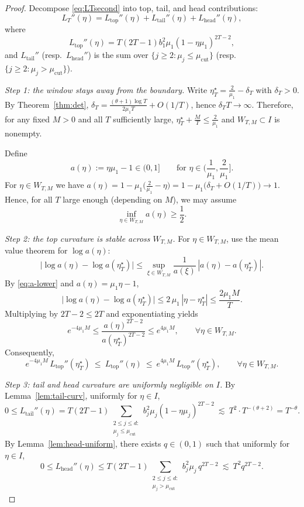 \documentclass[11pt]{article}
\begin{document}
\begin{proof}
Decompose \eqref{eq:LTsecond} into top, tail, and head contributions:
\[
L_T''(\eta)=L_{\mathrm{top}}''(\eta)+L_{\mathrm{tail}}''(\eta)+L_{\mathrm{head}}''(\eta),
\]
where
\[
L_{\mathrm{top}}''(\eta)=T(2T-1)b_1^2\mu_1(1-\eta\mu_1)^{2T-2},
\]
and $L_{\mathrm{tail}}''$ (resp.\ $L_{\mathrm{head}}''$) is the sum over
$\{j\ge 2:\mu_j\le \mu_{\mathrm{cut}}\}$ (resp.\ $\{j\ge 2:\mu_j>\mu_{\mathrm{cut}}\}$).

\medskip\noindent
\emph{Step 1: the window stays away from the boundary.}
Write $\eta_T^\star=\frac{2}{\mu_1}-\delta_T$ with $\delta_T>0$.
By Theorem~\ref{thm:det}, $\delta_T=\frac{(\theta+1)\log T}{2\mu_1 T}+O(1/T)$, hence
$\delta_T T\to\infty$. Therefore, for any fixed $M>0$ and all $T$ sufficiently large,
$\eta_T^\star+\frac{M}{T}\le \frac{2}{\mu_1}$ and $W_{T,M}\subset I$ is nonempty.

Define
\[
a(\eta):=\eta\mu_1-1\in(0,1] \qquad \text{for }\eta\in\Big(\frac{1}{\mu_1},\frac{2}{\mu_1}\Big].
\]
For $\eta\in W_{T,M}$ we have $a(\eta)=1-\mu_1\big(\frac{2}{\mu_1}-\eta\big)
=1-\mu_1\big(\delta_T+O(1/T)\big)\to 1$.
Hence, for all $T$ large enough (depending on $M$), we may assume
\begin{equation}\label{eq:a-lower}
\inf_{\eta\in W_{T,M}} a(\eta)\ge \frac12.
\end{equation}

\medskip\noindent
\emph{Step 2: the top curvature is stable across $W_{T,M}$.}
For $\eta\in W_{T,M}$, use the mean value theorem for $\log a(\eta)$:
\[
\big|\log a(\eta)-\log a(\eta_T^\star)\big|
\le \sup_{\xi\in W_{T,M}}\frac{1}{a(\xi)}\,|a(\eta)-a(\eta_T^\star)|.
\]
By \eqref{eq:a-lower} and $a(\eta)=\mu_1\eta-1$,
\[
\big|\log a(\eta)-\log a(\eta_T^\star)\big|
\le 2\,\mu_1\,|\eta-\eta_T^\star|
\le \frac{2\mu_1 M}{T}.
\]
Multiplying by $2T-2\le 2T$ and exponentiating yields
\[
e^{-4\mu_1 M}
\le
\frac{a(\eta)^{2T-2}}{a(\eta_T^\star)^{2T-2}}
\le
e^{4\mu_1 M},
\qquad \forall \eta\in W_{T,M}.
\]
Consequently,
\begin{equation}\label{eq:top-stable}
e^{-4\mu_1 M}\,L_{\mathrm{top}}''(\eta_T^\star)
\ \le\
L_{\mathrm{top}}''(\eta)
\ \le\
e^{4\mu_1 M}\,L_{\mathrm{top}}''(\eta_T^\star),
\qquad \forall \eta\in W_{T,M}.
\end{equation}

\medskip\noindent
\emph{Step 3: tail and head curvature are uniformly negligible on $I$.}
By Lemma~\ref{lem:tail-curv}, uniformly for $\eta\in I$,
\[
0\le L_{\mathrm{tail}}''(\eta)
=
T(2T-1)\sum_{\substack{2\le j\le d:\\ \mu_j\le\mu_{\mathrm{cut}}}}
b_j^2\mu_j(1-\eta\mu_j)^{2T-2}
\ \lesssim\
T^2\cdot T^{-(\theta+2)}
=
T^{-\theta}.
\]
By Lemma~\ref{lem:head-uniform}, there exists $q\in(0,1)$ such that uniformly for $\eta\in I$,
\[
0\le L_{\mathrm{head}}''(\eta)
\le
T(2T-1)\sum_{\substack{2\le j\le d:\\ \mu_j>\mu_{\mathrm{cut}}}}
b_j^2\mu_j\,q^{2T-2}
\ \lesssim\ T^2 q^{2T-2}.
\]


\end{proof}
\end{document}
